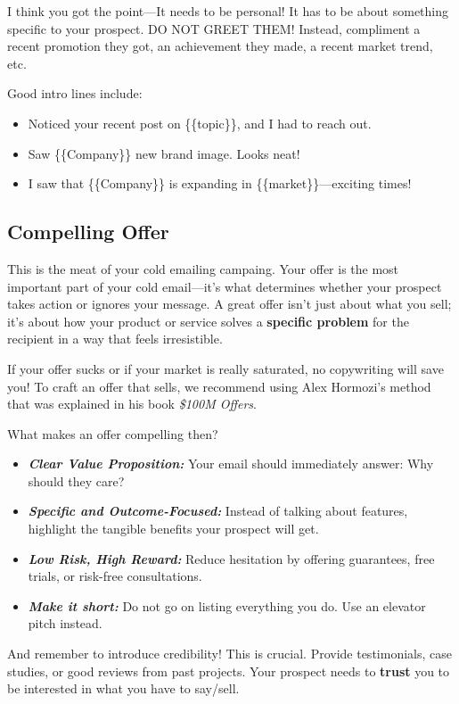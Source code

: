 \documentclass[12pt]{article}
\newcommand{\bb}[1]{\textbf{\textit{#1}}}
\begin{document}
I think you got the point---It needs to be personal! It has to be about something specific to your prospect. DO NOT GREET THEM! Instead, compliment a recent promotion they got, an achievement they made, a recent market trend, etc. \par

Good intro lines include:
\begin{itemize}
	\item Noticed your recent post on \{\{topic\}\}, and I had to reach out.
	\item Saw \{\{Company\}\} new brand image. Looks neat!
	\item I saw that \{\{Company\}\} is expanding in \{\{market\}\}—exciting times!
\end{itemize}

\subsection{Compelling Offer}
This is the meat of your cold emailing campaing. Your offer is the most important part of your cold email---it’s what determines whether your prospect takes action or ignores your message. A great offer isn’t just about what you sell; it’s about how your product or service solves a \textbf{specific problem} for the recipient in a way that feels irresistible. \par

If your offer sucks or if your market is really saturated, no copywriting will save you! To craft an offer that sells, we recommend using Alex Hormozi's method that was explained in his book \textit{\$100M Offers}. \par

What makes an offer compelling then?

\begin{itemize}
	\item \bb{Clear Value Proposition:} Your email should immediately answer: Why should they care?
	\item \bb{Specific and Outcome-Focused:} Instead of talking about features, highlight the tangible benefits your prospect will get.
	\item \bb{Low Risk, High Reward:} Reduce hesitation by offering guarantees, free trials, or risk-free consultations.
	\item \bb{Make it short:} Do not go on listing everything you do. Use an elevator pitch instead.
\end{itemize}

And remember to introduce credibility! This is crucial. Provide testimonials, case studies, or good reviews from past projects. Your prospect needs to \textbf{trust} you to be interested in what you have to say/sell.
\end{document}

